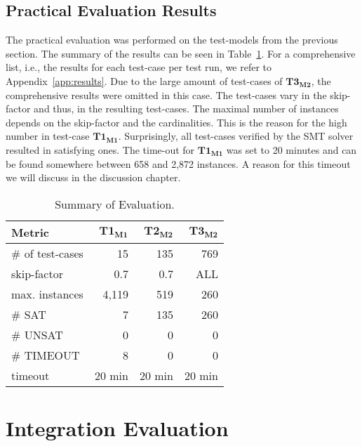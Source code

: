 \subsection{Practical Evaluation Results}

The practical evaluation was performed on the test-models from the previous section. The summary of the results can be seen in Table~\ref{tab:results}. For a comprehensive list, i.e., the results for each test-case per test run, we refer to Appendix~\ref{app:results}. Due to the large amount of test-cases of $\mathbf{T3_{M2}}$, the comprehensive results were omitted in this case.
The test-cases vary in the skip-factor and thus, in the resulting test-cases. The maximal number of instances depends on the skip-factor and the cardinalities. This is the reason for the high number in test-case $\mathbf{T1_{M1}}$. Surprisingly, all test-cases verified by the SMT solver resulted in satisfying ones. The time-out for $\mathbf{T1_{M1}}$ was set to 20 minutes and can be found somewhere between 658 and 2,872 instances. A reason for this timeout we will discuss in the discussion chapter.


\begin{table}
\centering
\begin{tabular}{|p{4cm}|r|r|r|}
\hline
\textbf{Metric}  & $\mathbf{T1_{M1}}$ & $\mathbf{T2_{M2}}$ & $\mathbf{T3_{M2}}$\\ \hline

\# of test-cases & 15 & 135 & 769\\ \hline

skip-factor & 0.7 & 0.7 & ALL\\ \hline

max. instances & 4,119 & 519 & 260\\ \hline

\# SAT & 7 & 135 & 260\\ \hline

\# UNSAT & 0 & 0 & 0\\ \hline

\# TIMEOUT & 8 & 0 & 0\\ \hline

timeout & 20 min & 20 min & 20 min\\ \hline

\end{tabular}
\caption[Summary of the evaluation.]{Summary of Evaluation.} \label{tab:results}
\end{table}

\section{Integration Evaluation}

